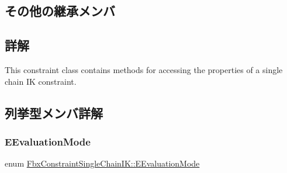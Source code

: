 \subsection*{その他の継承メンバ}


\subsection{詳解}
This constraint class contains methods for accessing the properties of a single chain IK constraint. 

\subsection{列挙型メンバ詳解}
\mbox{\label{class_fbx_constraint_single_chain_i_k_aa730475e0c3f9f1ecc04e61f39369fc1}} 
\subsubsection{\texorpdfstring{E\+Evaluation\+Mode}{EEvaluationMode}}
{\footnotesize\ttfamily enum \hyperlink{class_fbx_constraint_single_chain_i_k_aa730475e0c3f9f1ecc04e61f39369fc1}{Fbx\+Constraint\+Single\+Chain\+I\+K\+::\+E\+Evaluation\+Mode}}

